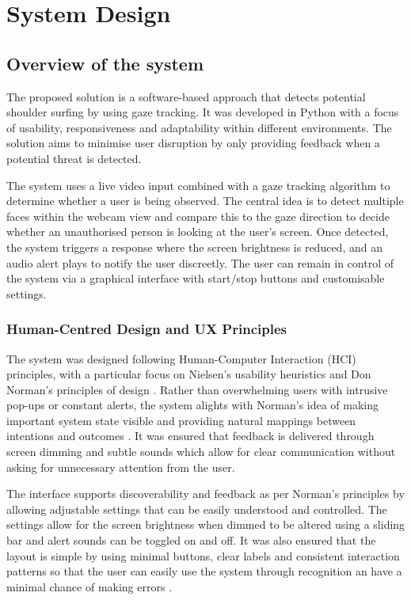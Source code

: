 \documentclass[12pt]{article}
\theoremstyle{plain}
\theoremstyle{definition}
\begin{document}
\section{System Design}
\label{sec:system design}

\subsection{Overview of the system}
\label{sec:Overview of the system}

The proposed solution is a software-based approach that detects potential shoulder surfing by using gaze tracking. It was developed in Python with a focus of usability, responsiveness and adaptability within different environments. The solution aims to minimise user disruption by only providing feedback when a potential threat is detected.

The system uses a live video input combined with a gaze tracking algorithm to determine whether a user is being observed. The central idea is to detect multiple faces within the webcam view and compare this to the gaze direction to decide whether an unauthorised person is looking at the user’s screen. Once detected, the system triggers a response where the screen brightness is reduced, and an audio alert plays to notify the user discreetly. The user can remain in control of the system via a graphical interface with start/stop buttons and customisable settings.

\subsubsection{Human-Centred Design and UX Principles}
\label{HCI}

The system was designed following Human-Computer Interaction (HCI) principles, with a particular focus on Nielsen’s usability heuristics \cite{nielsen_usability_nodate} and Don Norman’s principles of design \cite{norman_design_1983}. Rather than overwhelming users with intrusive pop-ups or constant alerts, the system alights with Norman’s idea of making important system state visible and providing natural mappings between intentions and outcomes \cite{norman_design_1983}. It was ensured that feedback is delivered through screen dimming and subtle sounds which allow for clear communication without asking for unnecessary attention from the user.

The interface supports discoverability and feedback as per Norman’s principles \cite{norman_design_1983} by allowing adjustable settings that can be easily understood and controlled. The settings allow for the screen brightness when dimmed to be altered using a sliding bar and alert sounds can be toggled on and off. It was also ensured that the layout is simple by using minimal buttons, clear labels and consistent interaction patterns so that the user can easily use the system through recognition an have a minimal chance of making errors \cite{nielsen_usability_nodate}.
\end{document}
